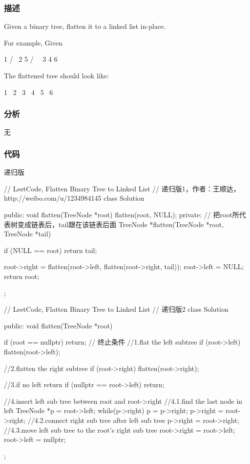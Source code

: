 \subsubsection{描述}
Given a binary tree, flatten it to a linked list in-place.

For example, Given
\begin{Code}
         1
        / \
       2   5
      / \   \
     3   4   6
\end{Code}

The flattened tree should look like:
\begin{Code}
   1
    \
     2
      \
       3
        \
         4
          \
           5
            \
             6
\end{Code}

\subsubsection{分析}
无


\subsubsection{代码}
递归版
\begin{Code}
// LeetCode, Flatten Binary Tree to Linked List
// 递归版1，作者：王顺达，http://weibo.com/u/1234984145
class Solution {
public:
    void flatten(TreeNode *root) {
        flatten(root, NULL);
    }
private:
    // 把root所代表树变成链表后，tail跟在该链表后面
    TreeNode *flatten(TreeNode *root, TreeNode *tail) {
        if (NULL == root) return tail;

        root->right = flatten(root->left, flatten(root->right, tail));
        root->left = NULL;
        return root;
    }
};
\end{Code}

\begin{Code}
// LeetCode, Flatten Binary Tree to Linked List
// 递归版2
class Solution {
public:
    void flatten(TreeNode *root) {
        if (root == nullptr) return;  // 终止条件
        //1.flat the left subtree
        if (root->left) flatten(root->left);

        //2.flatten the right subtree
        if (root->right) flatten(root->right);

        //3.if no left return
        if (nullptr == root->left) return;

        //4.insert left sub tree between root and root->right
        //4.1.find the last node in left
        TreeNode *p = root->left;
        while(p->right) p = p->right;
        p->right = root->right;
        //4.2.connect right sub tree after left sub tree
        p->right = root->right;
        //4.3.move left sub tree to the root's right sub tree
        root->right = root->left;
        root->left = nullptr;
    }
};
\end{Code}

